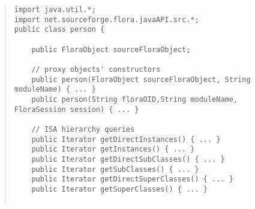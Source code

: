 \begin{quote}
\begin{verbatim}
import java.util.*;
import net.sourceforge.flora.javaAPI.src.*;
public class person {

    public FloraObject sourceFloraObject;

    // proxy objects' constructors
    public person(FloraObject sourceFloraObject, String moduleName) { ... }
    public person(String floraOID,String moduleName, FloraSession session) { ... }

    // ISA hierarchy queries
    public Iterator getDirectInstances() { ... }
    public Iterator getInstances() { ... }
    public Iterator getDirectSubClasses() { ... }
    public Iterator getSubClasses() { ... }
    public Iterator getDirectSuperClasses() { ... }
    public Iterator getSuperClasses() { ... }


\end{verbatim}
\end{quote}
